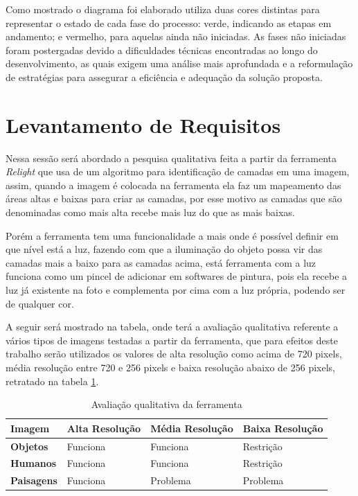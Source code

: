 Como mostrado o diagrama foi elaborado utiliza duas cores distintas para representar o estado de cada fase do processo: verde, indicando as etapas em andamento; e vermelho, para aquelas ainda não iniciadas. As fases não iniciadas foram postergadas devido a dificuldades técnicas encontradas ao longo do desenvolvimento, as quais exigem uma análise mais aprofundada e a reformulação de estratégias para assegurar a eficiência e adequação da solução proposta.

\section{Levantamento de Requisitos}

Nessa sessão será abordado a pesquisa qualitativa feita a partir da ferramenta \textit{Relight} que usa de um algoritmo para identificação de camadas em uma imagem, assim, quando a imagem é colocada na ferramenta ela faz um mapeamento das áreas altas e baixas para criar as camadas, por esse motivo as camadas que são denominadas como mais alta recebe mais luz do que as mais baixas.

Porém a ferramenta tem uma funcionalidade a mais onde é possível definir em que nível está a luz, fazendo com que a iluminação do objeto possa vir das camadas mais a baixo para as camadas acima, está ferramenta com a luz funciona como um pincel de adicionar em softwares de pintura, pois ela recebe a luz já existente na foto e complementa por cima com a luz própria, podendo ser de qualquer cor.

A seguir será mostrado na tabela, onde terá a avaliação qualitativa referente a vários tipos de imagens testadas a partir da ferramenta, que para efeitos deste trabalho serão utilizados os valores de alta resolução como acima de 720 pixels, média resolução entre 720 e 256 pixels e baixa resolução abaixo de 256 pixels, retratado na tabela \ref{tab:desempenho_imagens}.

\begin{table}[h!]
    \centering
    \begin{tabular}{|l|l|l|l|}
    \hline
    \textbf{Imagem}        & \textbf{Alta Resolução} & \textbf{Média Resolução} & \textbf{Baixa Resolução} \\ \hline
    \textbf{Objetos}       & Funciona                & Funciona                 & Restrição                \\ \hline
    \textbf{Humanos}       & Funciona                & Funciona                 & Restrição                \\ \hline
    \textbf{Paisagens}     & Funciona                & Problema                 & Problema                 \\ \hline
    \end{tabular}
    \caption{Avaliação qualitativa da ferramenta}
    \label{tab:desempenho_imagens}
\end{table}

